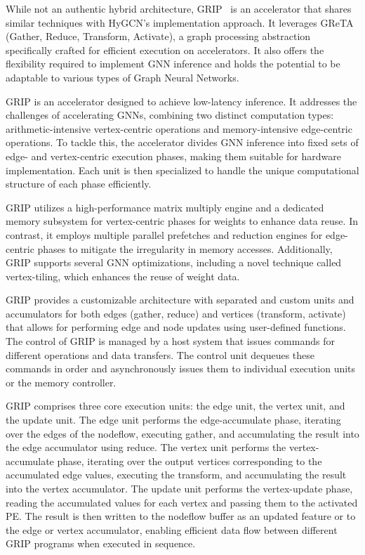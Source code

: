 While not an authentic hybrid architecture, GRIP~\cite{DBLP:journals/corr/abs-2007-13828} is an accelerator that shares similar techniques with HyGCN's implementation approach.
It leverages GReTA~\cite{greta-recoml20} (Gather, Reduce, Transform, Activate), a graph processing abstraction specifically crafted for efficient execution on accelerators.
It also offers the flexibility required to implement GNN inference and holds the potential to be adaptable to various types of Graph Neural Networks.

GRIP is an accelerator designed to achieve low-latency inference.
It addresses the challenges of accelerating GNNs, combining two distinct computation types: arithmetic-intensive vertex-centric operations and memory-intensive edge-centric operations.
To tackle this, the accelerator divides GNN inference into fixed sets of edge- and vertex-centric execution phases, making them suitable for hardware implementation.
Each unit is then specialized to handle the unique computational structure of each phase efficiently.

GRIP utilizes a high-performance matrix multiply engine and a dedicated memory subsystem for vertex-centric phases for weights to enhance data reuse.
In contrast, it employs multiple parallel prefetches and reduction engines for edge-centric phases to mitigate the irregularity in memory accesses.
Additionally, GRIP supports several GNN optimizations, including a novel technique called vertex-tiling, which enhances the reuse of weight data.

GRIP provides a customizable architecture with separated and custom units and accumulators for both edges (gather, reduce) and vertices (transform, activate) that allows for performing edge and node updates using user-defined functions.
The control of GRIP is managed by a host system that issues commands for different operations and data transfers.
The control unit dequeues these commands in order and asynchronously issues them to individual execution units or the memory controller.

GRIP comprises three core execution units: the edge unit, the vertex unit, and the update unit.
The edge unit performs the edge-accumulate phase, iterating over the edges of the nodeflow, executing gather, and accumulating the result into the edge accumulator using reduce.
The vertex unit performs the vertex-accumulate phase, iterating over the output vertices corresponding to the accumulated edge values, executing the transform, and accumulating the result into the vertex accumulator.
The update unit performs the vertex-update phase, reading the accumulated values for each vertex and passing them to the activated PE.
The result is then written to the nodeflow buffer as an updated feature or to the edge or vertex accumulator, enabling efficient data flow between different GRIP programs when executed in sequence.


